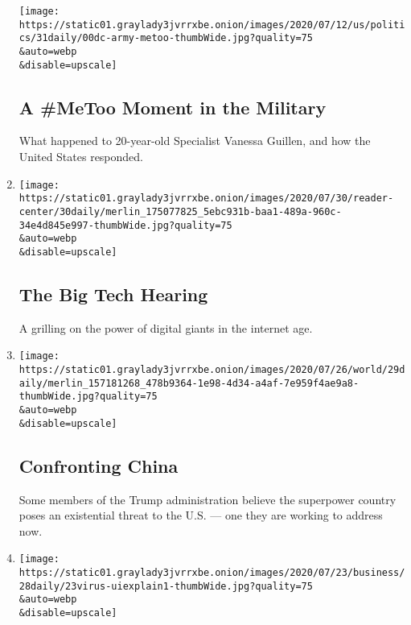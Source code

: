 \begin{enumerate}
  \texttt{[image: https://static01.graylady3jvrrxbe.onion/images/2020/07/12/us/politics/31daily/00dc-army-metoo-thumbWide.jpg?quality=75\\\&auto=webp\\\&disable=upscale]}

  \hypertarget{a-metoo-moment-in-the-military}{%
  \subsection{A \#MeToo Moment in the
  Military}\label{a-metoo-moment-in-the-military}}

  What happened to 20-year-old Specialist Vanessa Guillen, and how the
  United States responded.
\item
  \href{/2020/07/30/podcasts/the-daily/congress-facebook-amazon-google-apple.html}{}

  \texttt{[image: https://static01.graylady3jvrrxbe.onion/images/2020/07/30/reader-center/30daily/merlin\_175077825\_5ebc931b-baa1-489a-960c-34e4d845e997-thumbWide.jpg?quality=75\\\&auto=webp\\\&disable=upscale]}

  \hypertarget{the-big-tech-hearing}{%
  \subsection{The Big Tech Hearing}\label{the-big-tech-hearing}}

  A grilling on the power of digital giants in the internet age.
\item
  \href{/2020/07/29/podcasts/the-daily/china-trump-foreign-policy.html}{}

  \texttt{[image: https://static01.graylady3jvrrxbe.onion/images/2020/07/26/world/29daily/merlin\_157181268\_478b9364-1e98-4d34-a4af-7e959f4ae9a8-thumbWide.jpg?quality=75\\\&auto=webp\\\&disable=upscale]}

  \hypertarget{confronting-china}{%
  \subsection{Confronting China}\label{confronting-china}}

  Some members of the Trump administration believe the superpower
  country poses an existential threat to the U.S. --- one they are
  working to address now.
\item
  \href{/2020/07/28/podcasts/the-daily/unemployment-benefits-coronavirus.html}{}

  \texttt{[image: https://static01.graylady3jvrrxbe.onion/images/2020/07/23/business/28daily/23virus-uiexplain1-thumbWide.jpg?quality=75\\\&auto=webp\\\&disable=upscale]}


\end{enumerate}
